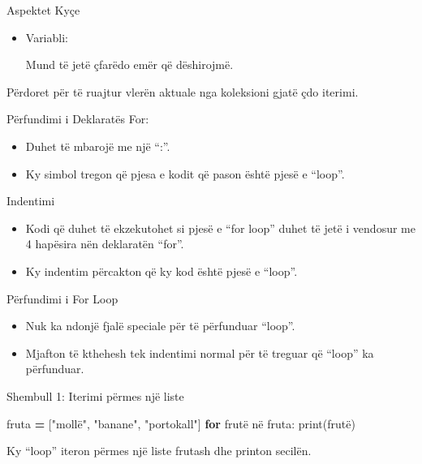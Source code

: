 \documentclass[
  ignorenonframetext,
]{beamer}
\newenvironment{Shaded}{\begin{snugshade}}{\end{snugshade}}
\newcommand{\BuiltInTok}[1]{#1}
\newcommand{\ControlFlowTok}[1]{\textcolor[rgb]{0.13,0.29,0.53}{\textbf{#1}}}
\newcommand{\NormalTok}[1]{#1}
\newcommand{\OperatorTok}[1]{\textcolor[rgb]{0.81,0.36,0.00}{\textbf{#1}}}
\newcommand{\StringTok}[1]{\textcolor[rgb]{0.31,0.60,0.02}{#1}}
\begin{document}
\begin{frame}{Aspektet Kyçe}
\protect\hypertarget{aspektet-kyuxe7e}{}
\begin{itemize}
\item
  Variabli:

  Mund të jetë çfarëdo emër që dëshirojmë.
\end{itemize}

Përdoret për të ruajtur vlerën aktuale nga koleksioni gjatë çdo iterimi.
\end{frame}

\begin{frame}{Përfundimi i Deklaratës For:}
\protect\hypertarget{puxebrfundimi-i-deklaratuxebs-for}{}
\begin{itemize}
\item
  Duhet të mbarojë me një ``:''.
\item
  Ky simbol tregon që pjesa e kodit që pason është pjesë e ``loop''.
\end{itemize}
\end{frame}

\begin{frame}{Indentimi}
\protect\hypertarget{indentimi}{}
\begin{itemize}
\item
  Kodi që duhet të ekzekutohet si pjesë e ``for loop'' duhet të jetë i
  vendosur me 4 hapësira nën deklaratën ``for''.
\item
  Ky indentim përcakton që ky kod është pjesë e ``loop''.
\end{itemize}
\end{frame}

\begin{frame}{Përfundimi i For Loop}
\protect\hypertarget{puxebrfundimi-i-for-loop}{}
\begin{itemize}
\item
  Nuk ka ndonjë fjalë speciale për të përfunduar ``loop''.
\item
  Mjafton të kthehesh tek indentimi normal për të treguar që ``loop'' ka
  përfunduar.
\end{itemize}
\end{frame}

\begin{frame}[fragile]{Shembull 1: Iterimi përmes një liste}
\protect\hypertarget{shembull-1-iterimi-puxebrmes-njuxeb-liste}{}
\begin{Shaded}
\begin{Highlighting}[]
\NormalTok{fruta }\OperatorTok{=}\NormalTok{ [}\StringTok{"mollë"}\NormalTok{, }\StringTok{"banane"}\NormalTok{, }\StringTok{"portokall"}\NormalTok{]}
\ControlFlowTok{for}\NormalTok{ frutë në fruta:}
    \BuiltInTok{print}\NormalTok{(frutë)}
\end{Highlighting}
\end{Shaded}

Ky ``loop'' iteron përmes një liste frutash dhe printon secilën.
\end{frame}
\end{document}
